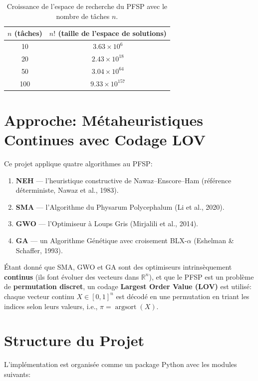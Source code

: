 \documentclass[12pt,a4paper,oneside]{report}
\begin{document}
\begin{table}[H]
\centering
\begin{tabular}{c|c}
\toprule
$n$ (t\^aches) & $n!$ (taille de l'espace de solutions) \\
\midrule
10  & $3.63 \times 10^{6}$ \\
20  & $2.43 \times 10^{18}$ \\
50  & $3.04 \times 10^{64}$ \\
100 & $9.33 \times 10^{157}$ \\
\bottomrule
\end{tabular}
\caption{Croissance de l'espace de recherche du PFSP avec le nombre de t\^aches $n$.}
\label{tab:search-space}
\end{table}

\section{Approche: M\'etaheuristiques Continues avec Codage LOV}

Ce projet applique quatre algorithmes au PFSP:

\begin{enumerate}[itemsep=4pt]
    \item \textbf{NEH} — l'heuristique constructive de Nawaz--Enscore--Ham (r\'ef\'erence d\'eterministe, Nawaz et al., 1983).
    \item \textbf{SMA} — l'Algorithme du Physarum Polycephalum (Li et al., 2020).
    \item \textbf{GWO} — l'Optimiseur \`a Loups Gris (Mirjalili et al., 2014).
    \item \textbf{GA} — un Algorithme G\'en\'etique avec croisement BLX-$\alpha$ (Eshelman \& Schaffer, 1993).
\end{enumerate}

\'Etant donn\'e que SMA, GWO et GA sont des optimiseurs intrins\`equement \textbf{continus} (ils font \'evoluer des vecteurs dans $\mathbb{R}^n$), et que le PFSP est un probl\`eme de \textbf{permutation discret}, un codage \textbf{Largest Order Value (LOV)} est utilis\'e: chaque vecteur continu $X \in [0, 1]^n$ est d\'ecod\'e en une permutation en triant les indices selon leurs valeurs, i.e., $\pi = \operatorname{argsort}(X)$.

\section{Structure du Projet}

L'impl\'ementation est organis\'ee comme un package Python avec les modules suivants:
\end{document}
